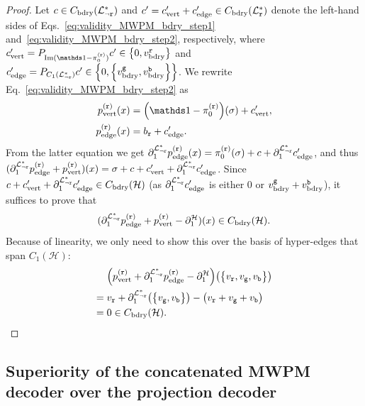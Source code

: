 \documentclass[a4paper,twocolumn,11pt,accepted=2025-01-21]{quantumarticle}
\theoremstyle{definition}
\theoremstyle{definition}
\theoremstyle{definition}
\begin{document}
\begin{proof}
    Let $c \in C_{\mathrm{bdry}}(\mathcal{L}_{\neg \texttt{r}}^*)$ and $c' = c'_{\mathrm{vert}} + c'_{\mathrm{edge}} \in C_{\mathrm{bdry}}(\mathcal{L}_{\texttt{r}}^*)$ denote the left-hand sides of Eqs.~\eqref{eq:validity_MWPM_bdry_step1} and~\eqref{eq:validity_MWPM_bdry_step2}, respectively, where $c'_\mr{vert} = P_{\Im (\identity - \pi_0^{(\rbs)})} c' \in \qty{0, \BdryVert{\rbs}}$ and $c'_{\mathrm{edge}} = P_{C_1(\mathcal{L}_{\neg \texttt{r}}^*)} c' \in \qty{0, \qty{v_{\mathrm{bdry}}^{\texttt{g}}, v_{\mathrm{bdry}}^{\texttt{b}}}}$.
    We rewrite Eq.~\eqref{eq:validity_MWPM_bdry_step2} as
    \begin{align*}
        p_\mr{vert}^{(\rbs)} (x) &= \qty(\identity - \pi_0^{(\rbs)})(\sigma) + c'_\mr{vert}, \\
        p_\mr{edge}^{(\rbs)} (x) &= b_\rbs + c'_\mr{edge}.
    \end{align*}
    From the latter equation we get $\partial_1^{\mathcal{L}_{\neg \texttt{r}}^*} p_{\mathrm{edge}}^{(\texttt{r})} (x) = \pi_0^{(\texttt{r})} (\sigma) + c + \partial_1^{\mathcal{L}_{\neg \texttt{r}}^*} c'_{\mathrm{edge}}$, and thus $(\partial_1^{\mathcal{L}_{\neg \texttt{r}}^*} p_{\mathrm{edge}}^{(\texttt{r})} + p_{\mathrm{vert}}^{(\texttt{r})}) (x) = \sigma + c + c'_{\mathrm{vert}} + \partial_1^{\mathcal{L}_{\neg \texttt{r}}^*} c'_{\mathrm{edge}}$.
    Since $c + c'_{\mathrm{vert}} + \partial_1^{\mathcal{L}_{\neg \texttt{r}}^*} c'_{\mathrm{edge}} \in C_{\mathrm{bdry}}(\mathcal{H})$ (as $\partial_1^{\mathcal{L}_{\neg \texttt{r}}^*} c'_{\mathrm{edge}}$ is either 0 or $v_{\mathrm{bdry}}^{\texttt{g}} + v_{\mathrm{bdry}}^{\texttt{b}}$), it suffices to prove that
    \begin{align*}
        (\partial_1^{\mathcal{L}_{\neg \texttt{r}}^*}  p_{\mathrm{edge}}^{(\texttt{r})} + p_{\mathrm{vert}}^{(\texttt{r})} - \partial_1^{\mathcal{H}})(x) \in C_{\mathrm{bdry}}\qty(\mathcal{H}).
    \end{align*}
    Because of linearity, we only need to show this over the basis of hyper-edges that span $C_1(\mathcal{H})$:
    \begin{align*}
        &\qty(p_{\mathrm{vert}}^{(\texttt{r})} + \partial_1^{\mathcal{L}_{\neg \texttt{r}}^*} p_{\mathrm{edge}}^{(\texttt{r})} - \partial_1^{\mathcal{H}})\qty(\qty{v_{\texttt{r}},v_{\texttt{g}},v_{\texttt{b}}}) \\ 
        ={}& v_{\texttt{r}} + \partial_1^{\mathcal{L}_{\neg \texttt{r}}^*} \qty(\qty{v_{\texttt{g}},v_{\texttt{b}}}) - \qty(v_{\texttt{r}} + v_{\texttt{g}} + v_{\texttt{b}}) \\
        ={}& 0 \in C_{\mathrm{bdry}}\qty(\mathcal{H}).
    \end{align*}
\end{proof}

\subsection{Superiority of the concatenated MWPM decoder over the projection decoder}
\end{document}
